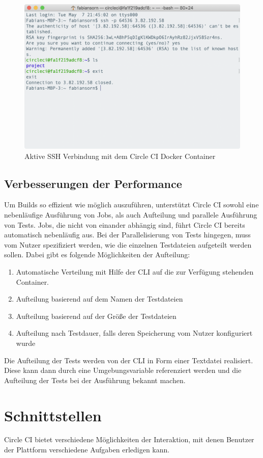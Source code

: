 \documentclass[11pt]{article}
\begin{document}
\begin{figure}[H]
	\centering
  	\includegraphics[width=0.7\linewidth]{../Images/Interact}
  	\caption{Aktive SSH Verbindung mit dem Circle CI Docker Container}
  	\label{fig:interact}
\end{figure}

\subsection{Verbesserungen der Performance}
Um Builds so effizient wie möglich auszuführen, unterstützt Circle CI sowohl eine nebenläufige Ausführung von Jobs, als auch Aufteilung und parallele Ausführung von Tests. Jobs, die nicht von einander abhängig sind, führt Circle CI bereits automatisch nebenläufig aus. Bei der Parallelisierung von Tests hingegen, muss vom Nutzer spezifiziert werden, wie die einzelnen Testdateien aufgeteilt werden sollen. Dabei gibt es folgende Möglichkeiten der Aufteilung:
\begin{enumerate}
	\item Automatische Verteilung mit Hilfe der CLI auf die zur Verfügung stehenden Container.
    \item Aufteilung basierend auf dem Namen der Testdateien
    \item Aufteilung basierend auf der Größe der Testdateien
    \item Aufteilung nach Testdauer, falls deren Speicherung vom Nutzer konfiguriert wurde
\end{enumerate}
Die Aufteilung der Tests werden von der CLI in Form einer Textdatei realisiert. Diese kann dann durch eine Umgebungsvariable referenziert werden und die Aufteilung der Tests bei der Ausführung bekannt machen.

\section{Schnittstellen}
Circle CI bietet verschiedene Möglichkeiten der Interaktion, mit denen Benutzer der Plattform verschiedene Aufgaben erledigen kann.
\end{document}

